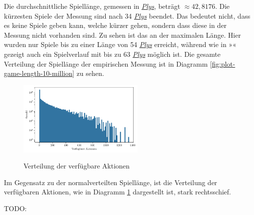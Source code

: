 Die durchschnittliche Spiellänge, gemessen in \hyperref[text:ply]{\emph{Plys}}, beträgt ${\approx}42{,}8176$. Die kürzesten Spiele der Messung sind nach 34 \hyperref[text:ply]{\emph{Plys}} beendet. Das bedeutet nicht, dass es keine Spiele geben kann, welche kürzer gehen, sondern dass diese in der Messung nicht vorhanden sind. Zu sehen ist das an der maximalen Länge. Hier wurden nur Spiele bis zu einer Länge von 54 \hyperref[text:ply]{\emph{Plys}} erreicht, während wie in »« gezeigt auch ein Spielverlauf mit bis zu 63 \hyperref[text:ply]{\emph{Plys}} möglich ist. Die gesamte Verteilung der Spiellänge der empirischen Messung ist in Diagramm \ref{fig:plot-game-length-10-million} zu sehen.

\begin{figure}
    \vspace*{-0.75cm}
    \centering
    \includegraphics[width=0.549\textwidth]{res/pictures/plots/available_actions.pdf}
    \caption[Verteilung der verfügbare Aktionen]{\unskip}
    Verteilung der verfügbare Aktionen
    \label{fig:plot-available-actions-10-million}
    \vspace*{-0.75cm}
\end{figure}

Im Gegensatz zu der normalverteilten Spiellänge, ist die Verteilung der verfügbaren Aktionen, wie in Diagramm \ref{fig:plot-available-actions-10-million} dargestellt ist, stark rechtsschief.

TODO:





